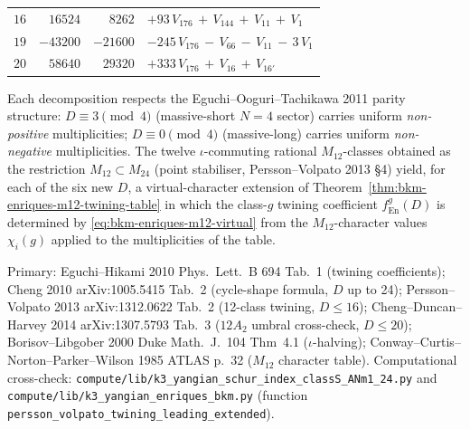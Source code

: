 \begin{theorem}
\begin{center}
\begin{tabular}{r|r|r|l}
$16$ & $16524$ & $8262$ & $+93\,V_{176}\,+\,V_{144}\,+\,V_{11}\,+\,V_1$ \\
$19$ & $-43200$ & $-21600$ & $-245\,V_{176}\,-\,V_{66}\,-\,V_{11}\,-\,3\,V_1$ \\
$20$ & $58640$ & $29320$ & $+333\,V_{176}\,+\,V_{16}\,+\,V_{16'}$ \\
\bottomrule
\end{tabular}
\end{center}
Each decomposition respects the Eguchi--Ooguri--Tachikawa 2011 parity
structure: $D\equiv 3\pmod 4$ (massive-short $N = 4$ sector) carries
uniform \emph{non-positive} multiplicities; $D\equiv 0\pmod 4$
(massive-long) carries uniform \emph{non-negative} multiplicities. The
twelve $\iota$-commuting rational $M_{12}$-classes obtained as the
restriction $M_{12}\subset M_{24}$ (point stabiliser, Persson--Volpato
2013 \S 4) yield, for each of the six new $D$, a virtual-character
extension of Theorem~\ref{thm:bkm-enriques-m12-twining-table} in which
the class-$g$ twining coefficient $f^g_{\mathrm{En}}(D)$ is determined
by
\eqref{eq:bkm-enriques-m12-virtual} from the $M_{12}$-character values
$\chi_i(g)$ applied to the multiplicities of the table.

Primary:
Eguchi--Hikami 2010 Phys.\ Lett.\ B 694 Tab.~1 (twining coefficients);
Cheng 2010 arXiv:1005.5415 Tab.~2 (cycle-shape formula, $D$ up to 24);
Persson--Volpato 2013 arXiv:1312.0622 Tab.~2 (12-class twining, $D \leq
16$); Cheng--Duncan--Harvey 2014 arXiv:1307.5793 Tab.~3 ($12A_2$ umbral
cross-check, $D \leq 20$); Borisov--Libgober 2000 Duke Math.\ J.\ 104
Thm~4.1 ($\iota$-halving); Conway--Curtis--Norton--Parker--Wilson 1985
ATLAS p.~32 ($M_{12}$ character table). Computational cross-check:
\texttt{compute/lib/k3\_yangian\_schur\_index\_classS\_ANm1\_24.py}
and
\texttt{compute/lib/k3\_yangian\_enriques\_bkm.py}
(function \texttt{persson\_volpato\_twining\_leading\_extended}).
\end{theorem}

